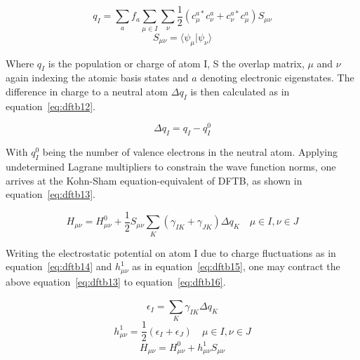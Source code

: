 \documentclass[11pt]{article}
\begin{document}
\begin{equation}
  q_I = \sum_{a}^{}f_a\sum_{\mu \in I}^{}\sum_{\nu}^{}\frac{1}{2}(c_{\mu}^{a*}c_{\nu}^a + c_{\nu}^{a*}c_{\mu}^a)S_{\mu\nu}
  \label{eq:dftb11}
\end{equation}
\begin{equation*}
  S_{\mu\nu} = \langle\psi_{\mu}|\psi_{\nu}\rangle
\end{equation*}

\bigskip

\noindent Where $q_I$ is the population or charge of atom I, S the overlap matrix, $\mu$ and $\nu$ again indexing the atomic basis states and $a$ denoting electronic eigenstates.
The difference in charge to a neutral atom $\Delta q_I$ is then calculated as in equation~\ref{eq:dftb12}.

\begin{equation}
  \Delta q_I = q_I - q_I^{0}
  \label{eq:dftb12}
\end{equation}

\bigskip

\noindent With $q_I^{0}$ being the number of valence electrons in the neutral atom.
Applying undetermined Lagrane multipliers to constrain the wave function norms, one arrives at the Kohn-Sham equation-equivalent of DFTB, as shown in equation~\ref{eq:dftb13}.

\begin{equation}
  H_{\mu\nu} = H_{\mu\nu}^0 + \frac{1}{2}S_{\mu\nu}\sum_{K}^{}(\gamma_{IK} + \gamma_{JK})\Delta q_K  \quad \mu \in I, \nu \in J
  \label{eq:dftb13}
\end{equation}

\bigskip

\noindent Writing the electrostatic potential on atom I due to charge fluctuations as in equation~\ref{eq:dftb14} and $h_{\mu\nu}^1$ as in equation~\ref{eq:dftb15}, one may contract the above equation~\ref{eq:dftb13} to equation~\ref{eq:dftb16}.

\begin{equation}
  \epsilon_I = \sum_{K}^{}\gamma_{IK}\Delta q_K
  \label{eq:dftb14}
\end{equation}
\begin{equation}
  h_{\mu\nu}^1 = \frac{1}{2}(\epsilon_I + \epsilon_J) \quad \mu \in I, \nu \in J
  \label{eq:dftb15}
\end{equation}
\begin{equation}
  H_{\mu\nu} = H_{\mu\nu}^0 + h_{\mu\nu}^1S_{\mu\nu}
  \label{eq:dftb16}
\end{equation}
\end{document}
